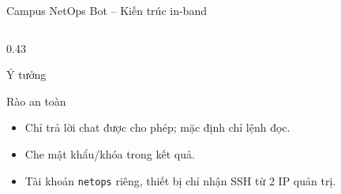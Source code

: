 \documentclass[aspectratio=169, 10pt, xcolor={table}]{beamer}
\begin{document}
\begin{frame}{Campus NetOps Bot -- Kiến trúc in-band}
\begin{columns}[T]
\begin{column}{0.43\textwidth}
\begin{card}{Ý tưởng}
\begin{itemize}
                \end{itemize}
            \end{card}
            \begin{card}[okGreen]{Rào an toàn}
                \footnotesize
                \begin{itemize}\setlength{\itemsep}{0pt}
                    \item Chỉ trả lời chat được cho phép; mặc định chỉ lệnh đọc.
                    \item Che mật khẩu/khóa trong kết quả.
                    \item Tài khoản \texttt{netops} riêng, thiết bị chỉ nhận SSH từ 2 IP quản trị.
                \end{itemize}
            \end{card}
        \end{column}
    \end{columns}
\end{frame}
\end{document}
